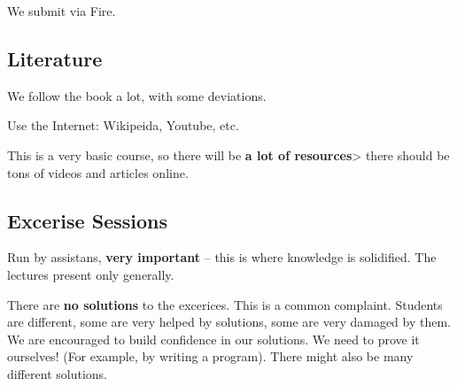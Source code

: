 \documentclass{article}
\begin{document}
We submit via Fire.

\subsection{Literature}

We follow the book a lot, with some deviations.

Use the Internet: Wikipeida, Youtube, etc.

This is a very basic course, so there will be \textbf{a lot of resources}> there should be tons of videos and articles online.

\subsection{Excerise Sessions}

Run by assistans, \textbf{very important} – this is where knowledge is solidified. The lectures present only generally.

There are \textbf{no solutions} to the excerices. This is a common complaint. Students are different, some are very helped by solutions, some are very damaged by them. We are encouraged to build confidence in our solutions. We need to prove it ourselves! (For example, by writing a program). There might also be many different solutions.
\end{document}
